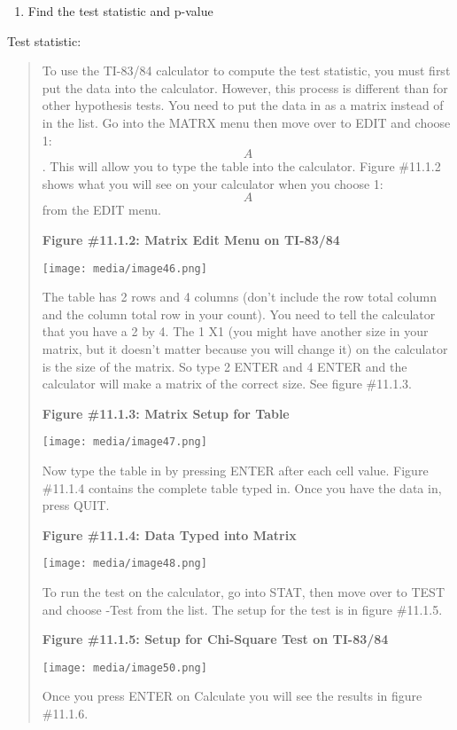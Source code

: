\documentclass[]{book}
\providecommand{\tightlist}{%
  \setlength{\itemsep}{0pt}\setlength{\parskip}{0pt}}
\begin{document}
\begin{enumerate}
\def\labelenumi{\arabic{enumi}.}
\setcounter{enumi}{2}
\tightlist
\item
  Find the test statistic and p-value
\end{enumerate}

Test statistic:

\begin{quote}
To use the TI-83/84 calculator to compute the test statistic, you must first put the data into the calculator. However, this process is different than for other hypothesis tests. You need to put the data in as a matrix instead of in the list. Go into the MATRX menu then move over to EDIT and choose 1:\[A\]. This will allow you to type the table into the calculator. Figure \#11.1.2 shows what you will see on your calculator when you choose 1:\[A\] from the EDIT menu.

\textbf{Figure \#11.1.2: Matrix Edit Menu on TI-83/84}

\texttt{[image: media/image46.png]}

The table has 2 rows and 4 columns (don't include the row total column and the column total row in your count). You need to tell the calculator that you have a 2 by 4. The 1 X1 (you might have another size in your matrix, but it doesn't matter because you will change it) on the calculator is the size of the matrix. So type 2 ENTER and 4 ENTER and the calculator will make a matrix of the correct size. See figure \#11.1.3.

\textbf{Figure \#11.1.3: Matrix Setup for Table}

\texttt{[image: media/image47.png]}

Now type the table in by pressing ENTER after each cell value. Figure \#11.1.4 contains the complete table typed in. Once you have the data in, press QUIT.

\textbf{Figure \#11.1.4: Data Typed into Matrix}

\texttt{[image: media/image48.png]}

To run the test on the calculator, go into STAT, then move over to TEST and choose -Test from the list. The setup for the test is in figure \#11.1.5.

\textbf{Figure \#11.1.5: Setup for Chi-Square Test on TI-83/84}

\texttt{[image: media/image50.png]}

Once you press ENTER on Calculate you will see the results in figure \#11.1.6.


\end{quote}
\end{document}
